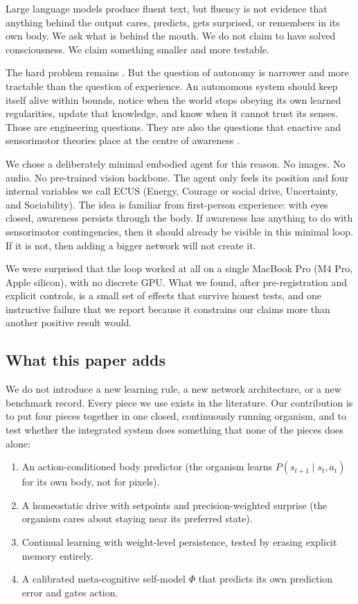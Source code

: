 \documentclass[11pt,a4paper]{article}
\begin{document}
Large language models produce fluent text, but fluency is not evidence that anything behind the output cares, predicts, gets surprised, or remembers in its own body. We ask what is behind the mouth. We do not claim to have solved consciousness. We claim something smaller and more testable.

The hard problem remains \cite{chalmers1995}. But the question of autonomy is narrower and more tractable than the question of experience. An autonomous system should keep itself alive within bounds, notice when the world stops obeying its own learned regularities, update that knowledge, and know when it cannot trust its senses. Those are engineering questions. They are also the questions that enactive and sensorimotor theories place at the centre of awareness \cite{oregan2001, thompson2007}.

We chose a deliberately minimal embodied agent for this reason. No images. No audio. No pre-trained vision backbone. The agent only feels its position and four internal variables we call ECUS (Energy, Courage or social drive, Uncertainty, and Sociability). The idea is familiar from first-person experience: with eyes closed, awareness persists through the body. If awareness has anything to do with sensorimotor contingencies, then it should already be visible in this minimal loop. If it is not, then adding a bigger network will not create it.

We were surprised that the loop worked at all on a single MacBook Pro (M4 Pro, Apple silicon), with no discrete GPU. What we found, after pre-registration and explicit controls, is a small set of effects that survive honest tests, and one instructive failure that we report because it constrains our claims more than another positive result would.

\subsection{What this paper adds}

We do not introduce a new learning rule, a new network architecture, or a new benchmark record. Every piece we use exists in the literature. Our contribution is to put four pieces together in one closed, continuously running organism, and to test whether the integrated system does something that none of the pieces does alone:

\begin{enumerate}[leftmargin=1.2em]
    \item An action-conditioned body predictor (the organism learns $P(s_{t+1} \mid s_t, a_t)$ for its own body, not for pixels).
    \item A homeostatic drive with setpoints and precision-weighted surprise (the organism cares about staying near its preferred state).
    \item Continual learning with weight-level persistence, tested by erasing explicit memory entirely.
    \item A calibrated meta-cognitive self-model $\Phi$ that predicts its own prediction error and gates action.
\end{enumerate}
\end{document}
